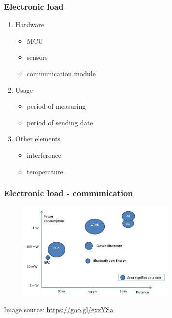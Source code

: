 \documentclass[12;pt,t]{beamer} %
\newcommand{\srctext}[1]{{\fontsize{7}{9}\selectfont\textcolor{sourcesclr}{#1}}}
\begin{document}
\begin{frame}
    \frametitle{Electronic load}
    \begin{center}
		\begin{enumerate}
			\item Hardware 
                \begin{itemize}
                    \item MCU
                    \item sensors
                    \item communication module
                \end{itemize}
			\item Usage
                \begin{itemize}
                    \item period of measuring
                    \item period of sending date
                \end{itemize}
			\item Other elements
                \begin{itemize}
                    \item interference
                    \item temperature
                \end{itemize}
        \end{enumerate}
    \end{center}
\end{frame}

\begin{frame}
    \frametitle{Electronic load - communication}    	
        \begin{figure}[H]
            \includegraphics[width=300px]{img/consuption-of-comunication-tech.jpg}
       	\end{figure}
    \srctext{Image source: \url{https://goo.gl/exzYSa}}
\end{frame}
\end{document}
